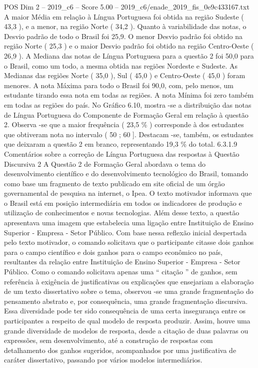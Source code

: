 \begin{textsample}{POS Dim 2 – 2019\_c6 – Score 5.00 – 2019\_c6/enade\_2019\_fis\_0e9c433167.txt}
A maior Média em relação à Língua Portuguesa foi obtida na região Sudeste ( 43,3 ), e a menor, na região Norte ( 34,2 ).
Quanto à variabilidade das notas, o Desvio padrão de todo o Brasil foi 25,9.
O menor Desvio padrão foi obtido na região Norte ( 25,3 ) e o maior Desvio padrão foi obtido na região Centro-Oeste ( 26,9 ).
A Mediana das notas de Língua Portuguesa para a questão 2 foi 50,0 para o Brasil, como um todo, a mesma obtida nas regiões Nordeste e Sudeste.
As Medianas das regiões Norte ( 35,0 ), Sul ( 45,0 ) e Centro-Oeste ( 45,0 ) foram menores.
A nota Máxima para todo o Brasil foi 90,0, com, pelo menos, um estudante tirando essa nota em todas as regiões.
A nota Mínima foi zero também em todas as regiões do país.
No Gráfico 6.10, mostra -se a distribuição das notas de Língua Portuguesa do Componente de Formação Geral em relação à questão 2.
Observa -se que a maior frequência ( 23,5 \% ) corresponde à dos estudantes que obtiveram nota no intervalo ( 50 ; 60 ].
Destacam -se, também, os estudantes que deixaram a questão 2 em branco, representando 19,3 \% do total. 6.3.1.9 Comentários sobre a correção de Língua Portuguesa das respostas à Questão Discursiva 2 A Questão 2 de Formação Geral abordava o tema do desenvolvimento científico e do desenvolvimento tecnológico do Brasil, tomando como base um fragmento de texto publicado em site oficial de um órgão governamental de pesquisa na internet, o Ipea.
O texto motivador informava que o Brasil está em posição intermediária em todos os indicadores de produção e utilização de conhecimentos e novas tecnologias.
Além desse texto, a questão apresentava uma imagem que estabelecia uma ligação entre Instituição de Ensino Superior - Empresa - Setor Público.
Com base nessa reflexão inicial despertada pelo texto motivador, o comando solicitava que o participante citasse dois ganhos para o campo científico e dois ganhos para o campo econômico no país, resultantes da relação entre Instituição de Ensino Superior - Empresa - Setor Público.
Como o comando solicitava apenas uma “ citação ” de ganhos, sem referência à exigência de justificativas ou explicações que ensejariam a elaboração de um texto dissertativo sobre o tema, observou -se uma grande fragmentação do pensamento abstrato e, por consequência, uma grande fragmentação discursiva.
Essa diversidade pode ter sido consequência de uma certa insegurança entre os participantes a respeito de qual modelo de resposta produzir.
Assim, houve uma grande diversidade de modelos de resposta, desde a citação de duas palavras ou expressões, sem desenvolvimento, até a construção de respostas com detalhamento dos ganhos sugeridos, acompanhados por uma justificativa de caráter dissertativo, passando por vários modelos intermediários.

\end{textsample}
